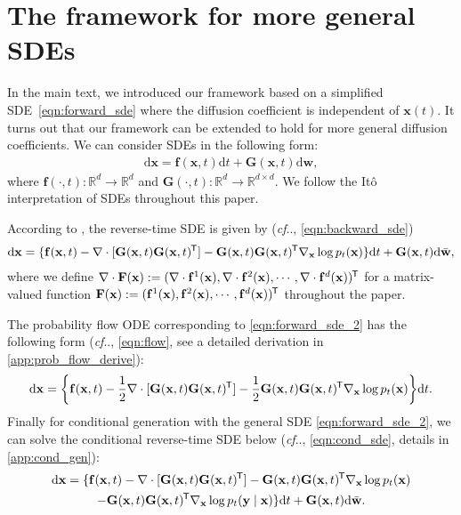 \documentclass{article} \usepackage{iclr2021_conference,times}
\makeatletter
\newcommand*{\tran}{^{\mkern-1.5mu\mathsf{T}}}
\newcommand{\mbf}[1]{\mathbf{#1}}
\newcommand{\mbb}[1]{\mathbb{#1}}
\newcommand{\ud}{\mathrm{d}}
\def\@onedot{\ifx\@let@token.\else.\null\fi\xspace}
\DeclareRobustCommand\onedot{\futurelet\@let@token\@onedot}
\newcommand{\bfx}{\mathbf{x}}
\newcommand{\bfw}{\mathbf{w}}
\newcommand{\bff}{\mathbf{f}}
\newcommand{\bfy}{\mathbf{y}}
\newcommand{\bfG}{\mathbf{G}}
\def\cf{\emph{cf}\onedot}
\makeatother
\begin{document}
\section{The framework for more general SDEs}\label{app:general_sde}
In the main text, we introduced our framework based on a simplified SDE~\cref{eqn:forward_sde} where the diffusion coefficient is independent of $\bfx(t)$. It turns out that our framework can be extended to hold for more general diffusion coefficients. We can consider SDEs in the following form:
\begin{align}
    \ud \bfx = \bff(\bfx, t) \ud t + \mbf{G}(\bfx, t) \ud \bfw, \label{eqn:forward_sde_2}
\end{align}
where $\bff(\cdot, t): \mbb{R}^d \to \mbb{R}^d$ and $\mbf{G}(\cdot, t): \mbb{R}^d \to \mbb{R}^{d\times d}$. We follow the It\^{o} interpretation of SDEs throughout this paper.

According to \citep{Anderson1982-ny}, the reverse-time SDE is given by (\cf, \cref{eqn:backward_sde})
\begin{align}
    \ud \bfx = \{\bff(\bfx, t) - \nabla \cdot [\bfG(\bfx, t) \bfG(\bfx,t)\tran] - \bfG(\bfx,t)\bfG(\bfx,t)\tran  \nabla_\bfx  \log p_t(\bfx)\} \ud t + \mbf{G}(\bfx, t) \ud \bar{\bfw},\label{eqn:backward_sde_2}
\end{align}
where we define $\nabla\cdot \mbf{F}(\bfx) := (\nabla \cdot \bff^1(\bfx), \nabla\cdot \bff^2(\bfx), \cdots, \nabla\cdot \bff^d(\bfx))\tran$ for a matrix-valued function $\mbf{F}(\bfx) := (\bff^1(\bfx), \bff^2(\bfx), \cdots, \bff^d(\bfx))\tran$ throughout the paper. 

The probability flow ODE corresponding to \cref{eqn:forward_sde_2} has the following form (\cf, \cref{eqn:flow}, see a detailed derivation in \cref{app:prob_flow_derive}):
\begin{align}
    \ud \bfx = \bigg\{\bff(\bfx, t) - \frac{1}{2} \nabla \cdot [\bfG(\bfx, t)\bfG(\bfx, t)\tran] - \frac{1}{2} \bfG(\bfx, t)\bfG(\bfx, t)\tran \nabla_\bfx \log p_t(\bfx)\bigg\} \ud t. \label{eqn:flow_2}
\end{align}
Finally for conditional generation with the general SDE \cref{eqn:forward_sde_2}, we can solve the conditional reverse-time SDE below (\cf, \cref{eqn:cond_sde}, details in \cref{app:cond_gen}):
\begin{multline}
\ud \bfx = \{\bff(\bfx, t) - \nabla \cdot [\bfG(\bfx, t) \bfG(\bfx,t)\tran] - \bfG(\bfx,t)\bfG(\bfx,t)\tran  \nabla_\bfx  \log p_t(\bfx)\\ - \bfG(\bfx,t)\bfG(\bfx,t)\tran  \nabla_{\bfx}  \log p_t(\bfy \mid \bfx)\} \ud t + \mbf{G}(\bfx, t) \ud \bar{\bfw}.\label{eqn:cond_sde_2}
\end{multline}
\end{document}
